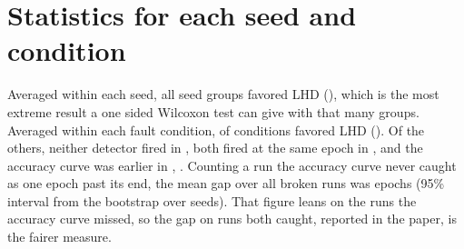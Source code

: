 \documentclass[11pt]{article}
\begin{document}
\begin{table}[ht]
\centering
\small
\caption{Faults beyond the main study, pooled over the three networks. Every detector is held to three epochs in a row. The zero update check and the \lhdSageThreshold{} dead rule count a run only when they name the planted layer, or a layer before a gradient cut, and any alarm counts for a learning rate jump, which has no planted layer. Bold marks the best value in a row when no other detector matches it.}
\label{tab:extra}

\end{table}

\section{Statistics for each seed and condition}
\label{sec:stats}

Averaged within each seed, all \lhdSeedGroups{} seed groups favored LHD (\lhdSeedP{}), which is the most extreme result a one sided Wilcoxon test can give with that many groups. Averaged within each fault condition, \lhdConditionsLHD{} of \lhdConditions{} conditions favored LHD (\lhdConditionP{}). Of the others, neither detector fired in \lhdConditionsNeither{}, both fired at the same epoch in \lhdConditionsSame{}, and the accuracy curve was earlier in \lhdConditionsAcc{}, \lhdConditionsAccWhere{}. Counting a run the accuracy curve never caught as one epoch past its end, the mean gap over all broken runs was \lhdMeanGapAll{} epochs (95\% interval \lhdMeanGapInterval{} from the bootstrap over seeds). That figure leans on the runs the accuracy curve missed, so the gap on runs both caught, reported in the paper, is the fairer measure.
\end{document}
